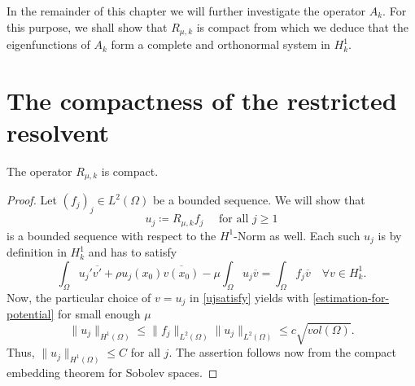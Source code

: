 In the remainder of this chapter we will further investigate the operator $A_{k}$. For this purpose, we shall show that $R_{\mu, k}$ is compact from which we deduce that the eigenfunctions of $A_{k}$ form a complete and orthonormal system in $H^{1}_{k}$.

\section{The compactness of the restricted resolvent} 

\begin{theorem} \label{3.1:thm-Rmuk.isCompact}
	The operator $R_{\mu, k}$ is compact.

	\begin{proof}
	Let $(f_{j})_{j} \in L^{2}(\Omega)$ be a  bounded sequence. We will show that 
		\[ u_{j} \coloneqq R_{\mu, k} f_{j} \quad \text{ for all } j \geq 1 \]
	is a bounded sequence with respect to the $H^{1}$-Norm as well. Each such $u_{j}$ is by definition in $H^{1}_{k}$ and has to satisfy
		\begin{equation}
			\int_{\Omega} u_{j}' \overline{v'} + \rho u_{j}(x_{0}) \overline{v(x_{0})} - \mu \int_{\Omega} u_{j} \overline{v} = \int_{\Omega} f_{j} \overline{v} \quad \forall v \in H^{1}_{k}. \label{ujsatisfy}
		\end{equation} 
	Now, the particular choice of $v = u_{j}$ in \eqref{ujsatisfy} yields with \eqref{estimation-for-potential} for small enough $\mu$
		\[  \| u_{j} \|_{H^{1}(\Omega)} \leq \| f_{j} \|_{L^{2}(\Omega)} \| u_{j} \|_{L^{2}(\Omega)} \leq c \sqrt{vol(\Omega)}. \]
	Thus, $\| u_{j} \|_{H^{1}(\Omega)} \leq C$ for all $j$. The assertion follows now from the compact embedding theorem for Sobolev spaces. %
	\end{proof}	
\end{theorem}		

